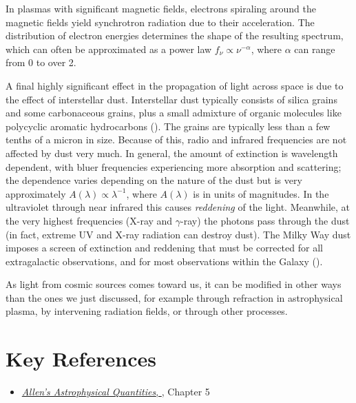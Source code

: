 In plasmas with significant magnetic fields, electrons spiraling
around the magnetic fields yield synchrotron radiation due to their
acceleration. The distribution of electron energies determines the
shape of the resulting spectrum, which can often be approximated as a
power law $f_\nu \propto \nu^{-\alpha}$, where $\alpha$ can range from
0 to over 2.

A final highly significant effect in the propagation of light across
space is due to the effect of interstellar dust. Interstellar dust
typically consists of silica grains and some carbonaceous grains, plus
a small admixture of organic molecules like polycyclic aromatic
hydrocarbons (\citealt{weingartner01a, draine03a}). The grains are
typically less than a few tenths of a micron in size. Because of this,
radio and infrared frequencies are not affected by dust very much. In
general, the amount of extinction is wavelength dependent, with bluer
frequencies experiencing more absorption and scattering; the
dependence varies depending on the nature of the dust but is very
approximately $A(\lambda) \propto \lambda^{-1}$, where $A(\lambda)$ is
in units of magnitudes. In the ultraviolet through near infrared this
causes {\it reddening} of the light. Meanwhile, at the very highest
frequencies (X-ray and $\gamma$-ray) the photons pass through the dust
(in fact, extreme UV and X-ray radiation can destroy dust). The Milky
Way dust imposes a screen of extinction and reddening that must be
corrected for all extragalactic observations, and for most
observations within the Galaxy (\citealt{schlegel98a}).

As light from cosmic sources comes toward us, it can be modified in
other ways than the ones we just discussed, for example through
refraction in astrophysical plasma, by intervening radiation fields,
or through other processes. 
  

\section{Key References}

\begin{itemize}
  \item
    \href{http://adsabs.harvard.edu/abs/2000asqu.book.....C}{
    {\it Allen's Astrophysical Quantities},
      \citet{cox00a}}, Chapter 5
\end{itemize}

